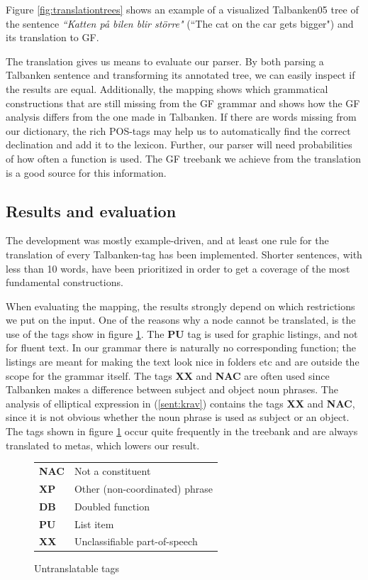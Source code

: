 \documentclass[10pt, a4paper]{article}
\begin{document}
Figure \ref{fig:translationtrees} shows an example of a visualized Talbanken05 tree
of the sentence \emph{``Katten p{\aa} bilen blir st{\"o}rre"}
(``The cat on the car gets bigger") and its translation to GF.

The translation 
gives us means to evaluate our parser. By both parsing a Talbanken sentence and
transforming its annotated tree, we can easily inspect if the results are
equal.
Additionally, the mapping shows which grammatical constructions that are still missing
from the GF grammar and shows how the GF analysis differs from the one made
in Talbanken.
If there are words missing from our dictionary, the rich
POS-tags may help us to automatically find the correct declination and add it to the
lexicon. Further, our parser will need probabilities of how often a function is
used. The GF treebank we achieve from the translation is a good source for this
information.\\

\subsection{Results and evaluation}
The development was mostly example-driven, and at least one rule for the translation of
every Talbanken-tag has been implemented.
Shorter sentences, with less than 10 words, have been prioritized in order to
get a coverage of the most fundamental constructions. 

When evaluating the mapping, the results strongly depend on which restrictions we
put on the input. 
One of the reasons why a node cannot be translated, is the 
use of the tags show in figure \ref{fig:mapBadtag}.
The \textbf{PU} tag is used for graphic listings, and not for fluent text.
In our grammar there is naturally no corresponding function; 
the listings are meant for making the text look nice in
folders etc and are outside the scope for the grammar itself. The tags \textbf{XX}
and \textbf{NAC} are often used since Talbanken makes a
difference between subject
and object noun phrases.
The analysis of elliptical expression in (\ref{sent:krav})
\label{sent:krav}
contains the tags \textbf{XX} and \textbf{NAC}, since it is not obvious
whether the noun phrase is used as subject or an object.
The tags shown in figure \ref{fig:mapBadtag} occur quite frequently in the treebank and are always translated
to metas, which lowers our result. \\
\begin{figure}[h]
\begin{tabular}{ll}
\textbf{NAC} & Not a constituent\\
\textbf{XP} & Other (non-coordinated) phrase\\
\textbf{DB} & Doubled function\\
\textbf{PU} & List item\\
\textbf{XX} & Unclassifiable part-of-speech\\
\end{tabular}
\caption{Untranslatable tags}\label{fig:mapBadtag}
\end{figure}
\end{document}

